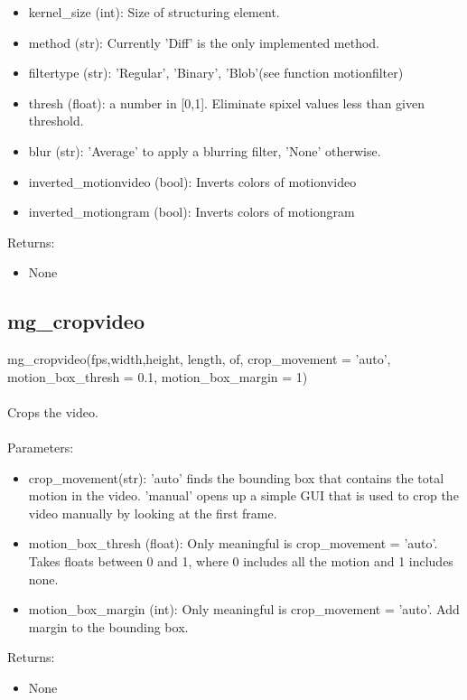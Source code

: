 \documentclass[9pt]{extarticle}
\begin{document}
    \begin{itemize}
    \item [] kernel\_size (int): Size of structuring element.
   \item [] method (str): Currently 'Diff' is the only implemented method. 
    \item [] filtertype (str): 'Regular', 'Binary', 'Blob'(see function motionfilter) 
    \item [] thresh (float): a number in [0,1]. Eliminate spixel values less than given threshold.
    \item [] blur (str): 'Average' to apply a blurring filter, 'None' otherwise.
    \item [] inverted\_motionvideo (bool): Inverts colors of motionvideo
    \item [] inverted\_motiongram (bool): Inverts colors of motiongram
    \end{itemize}
    Returns:
    \begin{itemize}
    \item [] None
    \end{itemize}


\subsection{mg\_cropvideo}

    mg\_cropvideo(fps,width,height, length, of, crop\_movement = 'auto', motion\_box\_thresh = 0.1, motion\_box\_margin = 1)
    \\\\
	Crops the video.\\\\
Parameters:
        \begin{itemize}
		\item [] crop\_movement(str): 'auto' finds the bounding box that contains the total motion in the video. 'manual' opens up a simple GUI that is used to crop the video manually by looking at the first frame.

		\item [] motion\_box\_thresh (float): Only meaningful is crop\_movement = 'auto'. Takes floats between 0 and 1, where 0 includes all the motion and 1 includes none.
		
		\item [] motion\_box\_margin (int): Only meaningful is crop\_movement = 'auto'. Add margin to the bounding box.
        \end{itemize}
	Returns:
    \begin{itemize}
	   \item [] None
    \end{itemize}
\end{document}
